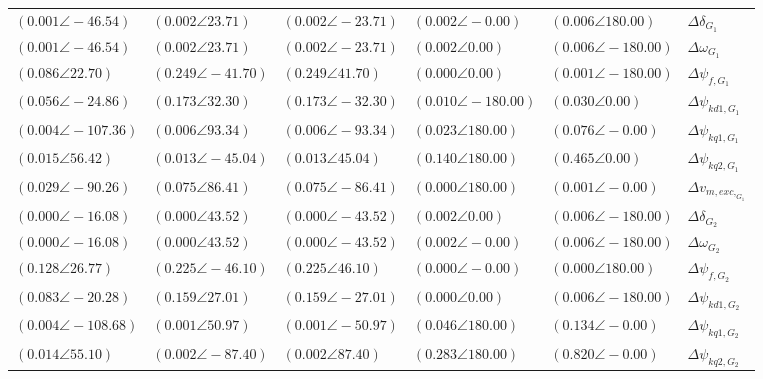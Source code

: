 \begin{tabular}{lllll|l}
$(0.001 \angle -46.54)$	& $(0.002 \angle 23.71)$	& $(0.002 \angle -23.71)$	& $(0.002 \angle -0.00)$	& $(0.006 \angle 180.00)$	& $\Delta\delta_{G_1}$ \\ 
$(0.001 \angle -46.54)$	& $(0.002 \angle 23.71)$	& $(0.002 \angle -23.71)$	& $(0.002 \angle 0.00)$	& $(0.006 \angle -180.00)$	& $\Delta\omega_{G_1}$ \\ 
$\mathbf{(0.086 \angle 22.70)}$	& $\mathbf{(0.249 \angle -41.70)}$	& $\mathbf{(0.249 \angle 41.70)}$	& $(0.000 \angle 0.00)$	& $(0.001 \angle -180.00)$	& $\Delta \psi_{f,G_1}$ \\ 
$\mathbf{(0.056 \angle -24.86)}$	& $\mathbf{(0.173 \angle 32.30)}$	& $\mathbf{(0.173 \angle -32.30)}$	& $(0.010 \angle -180.00)$	& $(0.030 \angle 0.00)$	& $\Delta \psi_{kd1,G_1}$ \\ 
$(0.004 \angle -107.36)$	& $(0.006 \angle 93.34)$	& $(0.006 \angle -93.34)$	& $(0.023 \angle 180.00)$	& $\mathbf{(0.076 \angle -0.00)}$	& $\Delta \psi_{kq1,G_1}$ \\ 
$(0.015 \angle 56.42)$	& $(0.013 \angle -45.04)$	& $(0.013 \angle 45.04)$	& $\mathbf{(0.140 \angle 180.00)}$	& $\mathbf{(0.465 \angle 0.00)}$	& $\Delta \psi_{kq2,G_1}$ \\ 
$(0.029 \angle -90.26)$	& $\mathbf{(0.075 \angle 86.41)}$	& $\mathbf{(0.075 \angle -86.41)}$	& $(0.000 \angle 180.00)$	& $(0.001 \angle -0.00)$	& $\Delta v_{m,exc,_{G_1}}$ \\ 
 \hline 
$(0.000 \angle -16.08)$	& $(0.000 \angle 43.52)$	& $(0.000 \angle -43.52)$	& $(0.002 \angle 0.00)$	& $(0.006 \angle -180.00)$	& $\Delta\delta_{G_2}$ \\ 
$(0.000 \angle -16.08)$	& $(0.000 \angle 43.52)$	& $(0.000 \angle -43.52)$	& $(0.002 \angle -0.00)$	& $(0.006 \angle -180.00)$	& $\Delta\omega_{G_2}$ \\ 
$\mathbf{(0.128 \angle 26.77)}$	& $\mathbf{(0.225 \angle -46.10)}$	& $\mathbf{(0.225 \angle 46.10)}$	& $(0.000 \angle -0.00)$	& $(0.000 \angle 180.00)$	& $\Delta \psi_{f,G_2}$ \\ 
$\mathbf{(0.083 \angle -20.28)}$	& $\mathbf{(0.159 \angle 27.01)}$	& $\mathbf{(0.159 \angle -27.01)}$	& $(0.000 \angle 0.00)$	& $(0.006 \angle -180.00)$	& $\Delta \psi_{kd1,G_2}$ \\ 
$(0.004 \angle -108.68)$	& $(0.001 \angle 50.97)$	& $(0.001 \angle -50.97)$	& $(0.046 \angle 180.00)$	& $\mathbf{(0.134 \angle -0.00)}$	& $\Delta \psi_{kq1,G_2}$ \\ 
$(0.014 \angle 55.10)$	& $(0.002 \angle -87.40)$	& $(0.002 \angle 87.40)$	& $\mathbf{(0.283 \angle 180.00)}$	& $\mathbf{(0.820 \angle -0.00)}$	& $\Delta \psi_{kq2,G_2}$ \\ 

\end{tabular}
